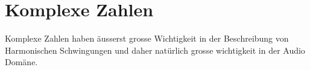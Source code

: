 \chapter{Komplexe Zahlen} \label{chap:complex}


Komplexe Zahlen haben äusserst grosse Wichtigkeit in der Beschreibung von Harmonischen Schwingungen und daher natürlich grosse wichtigkeit in der Audio Domäne.  

